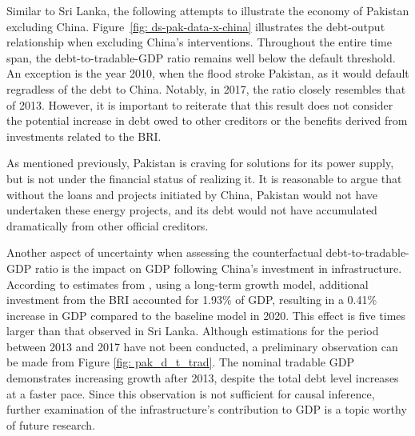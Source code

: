 Similar to Sri Lanka, the following attempts to illustrate the economy of Pakistan excluding China. Figure~\ref{fig: ds-pak-data-x-china} illustrates the debt-output relationship when excluding China's interventions. Throughout the entire time span, the debt-to-tradable-GDP ratio remains well below the default threshold. An exception is the year 2010, when the flood stroke Pakistan, as it would default regradless of the debt to China. Notably, in 2017, the ratio closely resembles that of 2013. However, it is important to reiterate that this result does not consider the potential increase in debt owed to other creditors or the benefits derived from investments related to the BRI.

As mentioned previously, Pakistan is craving for solutions for its power supply, but is not under the financial status of realizing it. It is reasonable to argue that without the loans and projects initiated by China, Pakistan would not have undertaken these energy projects, and its debt would not have accumulated dramatically from other official creditors.

Another aspect of uncertainty when assessing the counterfactual debt-to-tradable-GDP ratio is the impact on GDP following China's investment in infrastructure. According to estimates from \citet*{Bandiera-Vasileios-BRI-debt}, using a long-term growth model, additional investment from the BRI accounted for 1.93\% of GDP, resulting in a 0.41\% increase in GDP compared to the baseline model in 2020. This effect is five times larger than that observed in Sri Lanka. Although estimations for the period between 2013 and 2017 have not been conducted, a preliminary observation can be made from Figure \ref{fig: pak_d_t_trad}. The nominal tradable GDP demonstrates increasing growth after 2013, despite the total debt level increases at a faster pace. Since this observation is not sufficient for causal inference, further examination of the infrastructure's contribution to GDP is a topic worthy of future research.